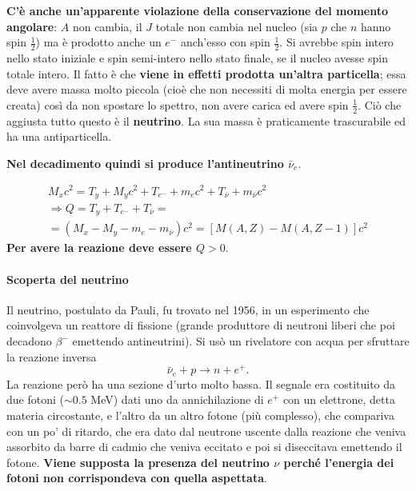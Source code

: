 \documentclass[a4paper,11pt,twoside,openany]{book}
\theoremstyle{definition}
\theoremstyle{plain}
\theoremstyle{plain}
\theoremstyle{definition}
\begin{document}
\textbf{C'è anche un'apparente violazione della conservazione del momento angolare}: $A$ non cambia, il $J$ totale non cambia nel nucleo (sia $p$ che $n$ hanno spin $\frac{1}{2}$) ma è prodotto anche un $e^-$ anch'esso con spin $\frac{1}{2}$. Si avrebbe spin intero nello stato iniziale e spin semi-intero nello stato finale, se il nucleo avesse spin totale intero. Il fatto è che \textbf{viene in effetti prodotta un'altra particella}; essa deve avere massa molto piccola (cioè che non necessiti di molta energia per essere creata) così da non spostare lo spettro, non avere carica ed avere spin $\frac{1}{2}$. Ciò che aggiusta tutto questo è il \textbf{neutrino}. La sua massa è praticamente trascurabile ed ha una antiparticella.

\textbf{Nel decadimento quindi si produce l'antineutrino $\bar\nu_e$}.

\begin{equation}\begin{split}
M_xc^2=T_y+M_yc^2+T_{e^-}+m_ec^2+T_{\bar\nu}+m_{\bar\nu}c^2\\
\Longrightarrow Q=T_y+T_{e^-}+T_{\bar\nu}=\\
=\left(M_x-M_y-m_e-m_{\bar\nu}\right)c^2=\left[M\left(A,Z\right)-M\left(A,Z-1\right)\right]c^2
\end{split}\end{equation}
\textbf{Per avere la reazione deve essere $Q>0$}.

\paragraph{Scoperta del neutrino} Il neutrino, postulato da Pauli, fu trovato nel 1956, in un esperimento che coinvolgeva un reattore di fissione (grande produttore di neutroni liberi che poi decadono $\beta^-$ emettendo antineutrini). Si usò un rivelatore con acqua per sfruttare la reazione inversa $$\bar\nu_e+p\longrightarrow n+e^+.$$ La reazione però ha una sezione d'urto molto bassa. Il segnale era costituito da due fotoni ($\sim 0.5$ MeV) dati uno da annichilazione di $e^+$ con un elettrone, detta materia circostante, e l'altro da un altro fotone (più complesso), che compariva con un po' di ritardo, che era dato dal neutrone uscente dalla reazione che veniva assorbito da barre di cadmio che veniva eccitato e poi si diseccitava emettendo il fotone. \textbf{Viene supposta la presenza del neutrino $\nu$ perché l'energia dei fotoni non corrispondeva con quella aspettata}.
\end{document}
